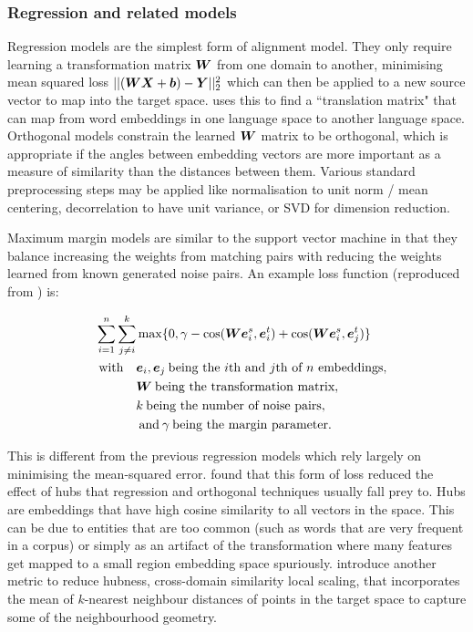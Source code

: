\subsubsection{Regression and related models}

Regression models are the simplest form of alignment model. They only require learning a transformation matrix $\boldsymbol{W}$ from one domain to another, minimising mean squared loss $|| (\boldsymbol{W} \boldsymbol{X} + \boldsymbol{b}) - \boldsymbol{Y}||_2^2$ which can then be applied to a new source vector to map into the target space. \cite{MikolovMachineTranslation} uses this to find a ``translation matrix" that can map from word embeddings in one language space to another language space. Orthogonal models constrain the learned $\boldsymbol{W}$ matrix to be orthogonal, which is appropriate if the angles between embedding vectors are more important as a measure of similarity than the distances between them. Various standard preprocessing steps may be applied like normalisation to unit norm / mean centering, decorrelation to have unit variance, or SVD for dimension reduction.

Maximum margin models are similar to the support vector machine \cite{SVM} in that they balance increasing the weights from matching pairs with reducing the weights learned from known generated noise pairs. An example loss function (reproduced from \cite{kalinowski2020survey}) is:

\begin{equation}
\begin{split}
\sum_{i=1}^n \sum_{j \neq i}^{k} &\max \{0, \gamma - \cos(\boldsymbol{W} \boldsymbol{e}_i^s, \boldsymbol{e}_i^t) + \cos(\boldsymbol{W} \boldsymbol{e}_i^s, \boldsymbol{e}_j^t)\}\\
\quad \text{with} \quad& \boldsymbol{e}_i, \boldsymbol{e}_j \medspace \text{being the $i$th and $j$th of $n$ embeddings},\\
& \boldsymbol{W} \medspace \text{being the transformation matrix},\\
& k \medspace \text{being the number of noise pairs}, \\
& \medspace \text{and}\medspace \gamma \medspace \text{being the margin parameter}.
\end{split}
\end{equation}

This is different from the previous regression models which rely largely on minimising the mean-squared error. \cite{Hubness} found that this form of loss reduced the effect of hubs that regression and orthogonal techniques usually fall prey to. Hubs are embeddings that have high cosine similarity to all vectors in the space. This can be due to entities that are too common (such as words that are very frequent in a corpus) or simply as an artifact of the transformation where many features get mapped to a small region embedding space spuriously. \cite{ImprovingSupervisedBilingualMapping} introduce another metric to reduce hubness, cross-domain similarity local scaling, that incorporates the mean of $k$-nearest neighbour distances of points in the target space to capture some of the neighbourhood geometry. 

